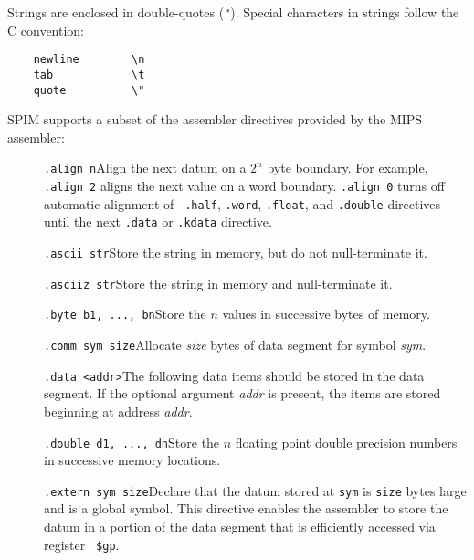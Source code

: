 \documentclass[11pt]{article}
\begin{document}
Strings are enclosed in double-quotes ({\tt "}).  Special characters
in strings follow the C convention:
\begin{verbatim}
    newline        \n
    tab            \t
    quote          \"
\end{verbatim}

SPIM supports a subset of the assembler directives provided by the
MIPS assembler:
\begin{description}
  \item [] {\tt .align n}\newline Align the next datum on a $2^n$ byte
boundary.  For example, {\tt .align 2} aligns the next value on a word
boundary.  {\tt .align 0} turns off automatic alignment of {\tt
.half}, {\tt .word}, {\tt .float}, and {\tt .double} directives until
the next {\tt .data} or {\tt .kdata} directive.

  \item [] {\tt .ascii str}\newline Store the string in memory, but do
not null-terminate it.

  \item [] {\tt .asciiz str}\newline Store the string in memory and
null-terminate it.

  \item [] {\tt .byte b1, ..., bn}\newline Store the $n$ values in
successive bytes of memory.

  \item [] {\tt .comm sym size}\newline Allocate {\em size} bytes of
data segment for symbol {\em sym}.

  \item [] {\tt .data <addr>}\newline The following data items should
be stored in the data segment.  If the optional argument {\em addr\/}
is present, the items are stored beginning at address {\em addr\/}.

  \item [] {\tt .double d1, ..., dn}\newline Store the $n$ floating
point double precision numbers in successive memory locations.

  \item [] {\tt .extern sym size}\newline Declare that the datum
stored at {\tt sym} is {\tt size} bytes large and is a global symbol.
This directive enables the assembler to store the datum in a portion
of the data segment that is efficiently accessed via register {\tt
\$gp}.


\end{description}
\end{document}
